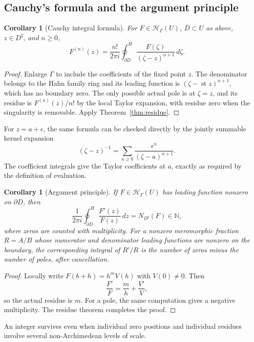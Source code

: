 \documentclass[11pt,a4paper]{article}
\newtheorem{corollary}[theorem]{Corollary}
\theoremstyle{definition}
\theoremstyle{remark}
\newcommand{\N}{\mathbb N}
\newcommand{\HH}{\mathcal H}
\newcommand{\st}{\operatorname{st}}
\newcommand{\Hoint}{\mathop{\oint}\nolimits^{\!H}}
\begin{document}
\subsection{Cauchy's formula and the argument principle}
\begin{corollary}[Cauchy integral formula]\label{cor:cauchy}
For $F\in\HH_\Gamma(U)$, $\overline D\subset U$ as above,
$z\in D^\sharp$, and $n\ge0$,
\begin{equation}\label{eq:cauchy}
 F^{(n)}(z)=\frac{n!}{2\pi i}
 \Hoint_{\partial D}\frac{F(\zeta)}{(\zeta-z)^{n+1}}\,d\zeta.
\end{equation}
\end{corollary}
\begin{proof}
Enlarge $\Gamma$ to include the coefficients of the fixed point $z$.
The denominator belongs to the Hahn family ring and its leading
function is $(\zeta-\st z)^{n+1}$, which has no boundary zero.
The only possible actual pole is at $\zeta=z$, and its residue is
$F^{(n)}(z)/n!$ by the local Taylor expansion, with residue zero
when the singularity is removable. Apply
Theorem~\ref{thm:residue}.
\end{proof}
For $z=a+\epsilon$, the same formula can be checked directly by the
jointly summable kernel expansion
\[
 (\zeta-z)^{-1}
   =\sum_{n\ge0}\frac{\epsilon^n}{(\zeta-a)^{n+1}}.
\]
The coefficient integrals give the Taylor coefficients at $a$, exactly
as required by the definition of evaluation.

\begin{corollary}[Argument principle]\label{cor:argument}
If $F\in\HH_\Gamma(U)$ has leading function nonzero on
$\partial D$, then
\[
 \frac1{2\pi i}\Hoint_{\partial D}\frac{F'(z)}{F(z)}\,dz
    =N_{D^\sharp}(F)\in\N,
\]
where zeros are counted with multiplicity. For a nonzero meromorphic
fraction $R=A/B$ whose numerator and denominator leading functions
are nonzero on the boundary, the corresponding integral of $R'/R$
is the number of zeros minus the number of poles, after cancellation.
\end{corollary}
\begin{proof}
Locally write $F(b+h)=h^mV(h)$ with $V(0)\ne0$. Then
\[
 \frac{F'}F=\frac mh+\frac{V'}V,
\]
so the actual residue is $m$. For a pole, the same computation gives
a negative multiplicity. The residue theorem completes the proof.
\end{proof}
An integer survives even when individual zero positions and individual
residues involve several non-Archimedean levels of scale.
\end{document}
